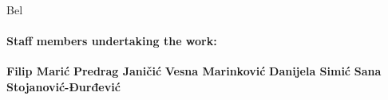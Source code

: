 \begin{sitedescription}{Bel}
\paragraph{Staff members undertaking the work:}

\textbf{Filip Marić}
\textbf{Predrag Janičić}
\textbf{Vesna Marinković}
\textbf{Danijela Simić}
\textbf{Sana Stojanović-Đurđević}


\end{sitedescription}

